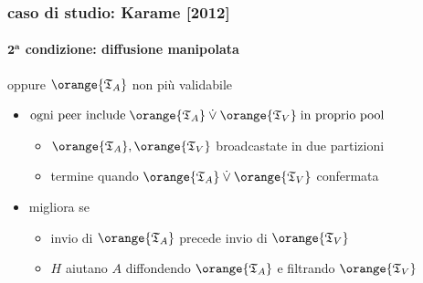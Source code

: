 \begin{frame}
	\frametitle{caso di studio: Karame [2012]}
	\framesubtitle{$\mathbf{2^a}$ \textbf{condizione}: diffusione manipolata}
	
	\newline oppure $\orange{\mathfrak{T}_A}$ non più validabile
	  		
	\begin{itemize}
	  \item $\text{ogni peer include}\;\orange{\mathfrak{T}_A}\:\dot{\vee}\:\orange{\mathfrak{T}_V}\;\text{in proprio pool}$
	  \begin{itemize}
	  	\item $\orange{\mathfrak{T}_A}, \orange{\mathfrak{T}_V}$ broadcastate in due partizioni 
		\item termine quando $\orange{\mathfrak{T}_A}\:\dot{\vee}\:\orange{\mathfrak{T}_V}$ confermata
 	  \end{itemize}
	  \item {} migliora se
		\begin{itemize}
			\item invio di $\orange{\mathfrak{T}_A}$ precede invio di $\orange{\mathfrak{T}_V}$ 
			\item $H$ aiutano $A$ diffondendo $\orange{\mathfrak{T}_A}$ e filtrando $\orange{\mathfrak{T}_V}$ 
		\end{itemize}
	\end{itemize}

\end{frame}
